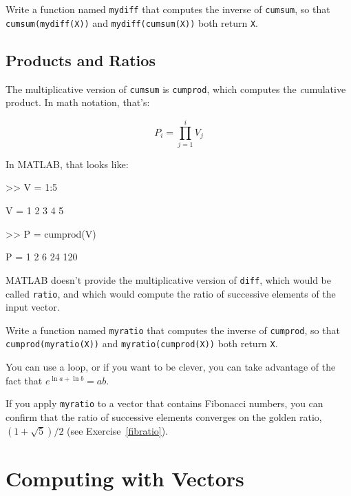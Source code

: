 \begin{ex}
Write a function named {\tt mydiff} that computes the
inverse of {\tt cumsum}, so that {\tt cumsum(mydiff(X))} and
{\tt mydiff(cumsum(X))} both return {\tt X}.

\end{ex}


\subsection{Products and Ratios}

The multiplicative version of {\tt cumsum} is {\tt cumprod},
which computes the {\emph cumulative product}.  In math notation,
that's:


\begin{equation}
P_i = \prod_{j=1}^i V_j
\end{equation}

In MATLAB, that looks like:

\begin{code}
>> V = 1:5

V = 1     2     3     4     5

>> P = cumprod(V)

P = 1     2     6    24   120
\end{code}

MATLAB doesn't provide the multiplicative version
of {\tt diff}, which would be called {\tt ratio}, and which would
compute the ratio of successive elements of the input vector.

\begin{ex}
Write a function named {\tt myratio} that computes the
inverse of {\tt cumprod}, so that {\tt cumprod(myratio(X))} and
{\tt myratio(cumprod(X))} both
return {\tt X}.

You can use a loop, or if you want to be clever, you can take
advantage of the fact that $e^{\ln a + \ln b} = a b$.

If you apply {\tt myratio} to a vector that contains Fibonacci
numbers, you can confirm that the ratio of successive elements
converges on the golden ratio, $(1+\sqrt{5})/2$ (see
Exercise~\ref{fibratio}).

\end{ex}

\section{Computing with Vectors}

